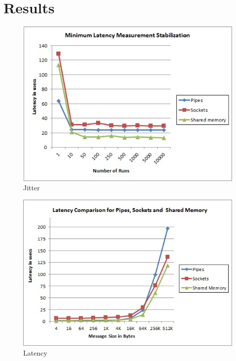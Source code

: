 \section{Results}\label{sec:res}



\begin{figure}
  \includegraphics[width=\linewidth]{graphs/jitter.jpg}
  \caption{Jitter} 
  \label{fig:jitter}
\end{figure}

\begin{figure}
  \includegraphics[width=\linewidth]{graphs/lat.jpg}
  \caption{Latency} 
  \label{fig:lat}
\end{figure}

